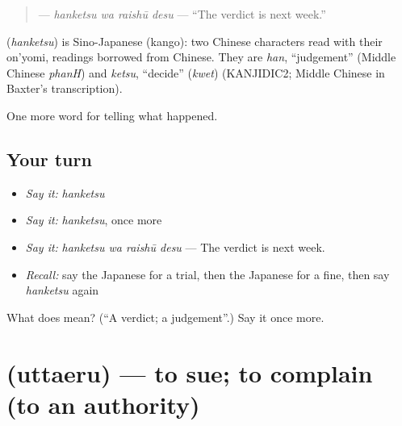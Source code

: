 \begin{quote}
\textbf{ } — \emph{hanketsu wa raishū desu} — \textquotedblleft{}The verdict is next week.\textquotedblright{}
\end{quote}

\begin{cousinweb}
\textbf{} (\emph{hanketsu}) is Sino-Japanese (kango): two Chinese characters read with their on'yomi, readings borrowed from Chinese. They are \emph{han}, \textquotedblleft{}judgement\textquotedblright{} (Middle Chinese \emph{phanH}) and \emph{ketsu}, \textquotedblleft{}decide\textquotedblright{} (\emph{kwet}) (KANJIDIC2; Middle Chinese in Baxter's transcription).
\end{cousinweb}

\begin{grammarlens}[title={What you've built}]
One more word for telling what happened.
\end{grammarlens}

\subsection*{Your turn}
\begin{itemize}
\raggedright
  \item \emph{Say it:} \emph{hanketsu}
  \item \emph{Say it:} \emph{hanketsu}, once more
  \item \emph{Say it:} \emph{hanketsu wa raishū desu} — The verdict is next week.
  \item \emph{Recall:} say the Japanese for a trial, then the Japanese for a fine, then say \emph{hanketsu} again
\end{itemize}

\begin{tcolorbox}[breakable,colback=teal!4,colframe=teal!35!black,title={Before you move on}]
What does  mean? (\textquotedblleft{}A verdict; a judgement\textquotedblright{}.) Say it once more.
\end{tcolorbox}
\section[\texorpdfstring{\ja{うったえる} (uttaeru)}{うったえる (uttaeru)}]{ (uttaeru) — to sue; to complain (to an authority)}

\label{lesson:JA-C273-uttaeru}



